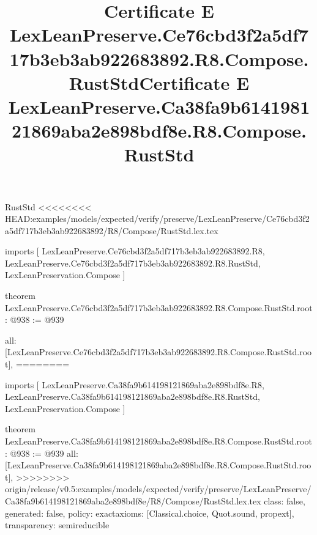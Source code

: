 \begin{lexlean}{RustStd}
<<<<<<<< HEAD:examples/models/expected/verify/preserve/LexLeanPreserve/Ce76cbd3f2a5df717b3eb3ab922683892/R8/Compose/RustStd.lex.tex
\title{Certificate E LexLeanPreserve.Ce76cbd3f2a5df717b3eb3ab922683892.R8.Compose.RustStd}
\begin{coremodule}
imports [
  LexLeanPreserve.Ce76cbd3f2a5df717b3eb3ab922683892.R8,
  LexLeanPreserve.Ce76cbd3f2a5df717b3eb3ab922683892.R8.RustStd,
  LexLeanPreservation.Compose
]

theorem LexLeanPreserve.Ce76cbd3f2a5df717b3eb3ab922683892.R8.Compose.RustStd.root : @938 := @939 {
  all: [LexLeanPreserve.Ce76cbd3f2a5df717b3eb3ab922683892.R8.Compose.RustStd.root],
========
\title{Certificate E LexLeanPreserve.Ca38fa9b614198121869aba2e898bdf8e.R8.Compose.RustStd}
\begin{coremodule}
imports [
  LexLeanPreserve.Ca38fa9b614198121869aba2e898bdf8e.R8,
  LexLeanPreserve.Ca38fa9b614198121869aba2e898bdf8e.R8.RustStd,
  LexLeanPreservation.Compose
]

theorem LexLeanPreserve.Ca38fa9b614198121869aba2e898bdf8e.R8.Compose.RustStd.root : @938 := @939 {
  all: [LexLeanPreserve.Ca38fa9b614198121869aba2e898bdf8e.R8.Compose.RustStd.root],
>>>>>>>> origin/release/v0.5:examples/models/expected/verify/preserve/LexLeanPreserve/Ca38fa9b614198121869aba2e898bdf8e/R8/Compose/RustStd.lex.tex
  class: false,
  generated: false,
  policy: exact{axioms: [Classical.choice, Quot.sound, propext]},
  transparency: semireducible
}


\end{coremodule}}
\end{coremodule}
\end{lexlean}
